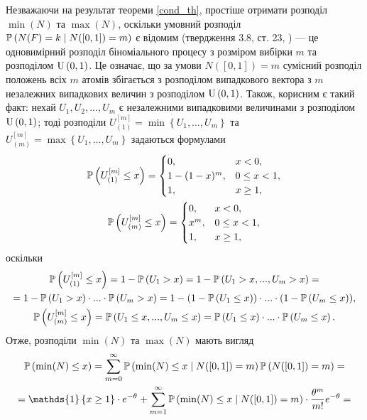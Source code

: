 Незважаючи на результат теореми \ref{cond_th}, простіше отримати розподіл
 $\min(N)$ та $\max(N)$, %
оскільки умовний розподіл $\P{N(F) = k \mid N([0, 1]) = m}$ 
є відомим (твердження 3.8, ст. 23, \cite{last_penrose_2017}) --- це
одновимірний розподіл
біноміального процесу з розміром вибірки $m$ та розподілом $\Unif{0, 1}$.
Це означає, що за умови $N([0, 1]) = m$
сумісний розподіл положень всіх $m$ атомів збігається з 
розподілом випадкового вектора 
з $m$ незалежних 
випадкових величин з розподілом $\Unif{0, 1}$.
Також, корисним є такий факт: нехай $U_1, U_2, \dots, U_m$ є
незалежними випадковими величинами з розподілом $\Unif{0, 1}$;
тоді розподіли $U_{(1)}^{[m]} = \min\left\{U_1, \dots, U_m\right\}$ 
та $U_{(m)}^{[m]} = \max\left\{U_1, \dots, U_m\right\}$ задаються
формулами
\begin{gather*}
    \P{U_{(1)}^{[m]} \leq x} = \begin{cases}
        0, & x < 0, \\
        1 - (1 - x)^m, & 0 \leq x < 1, \\
        1, & x \geq 1,
    \end{cases} \\
    \P{U_{(m)}^{[m]} \leq x} = \begin{cases}
        0, & x < 0, \\
        x^m, & 0 \leq x < 1, \\
        1, & x \geq 1,
    \end{cases}
\end{gather*}
оскільки
\begin{gather*}
    \P{U_{(1)}^{[m]} \leq x} = 1 - \P{U_{{1}} > x} = 1 - \P{U_1 > x, ..., U_m > x} = 
    \\ = 1 - \P{U_1 > x} \cdot ... \cdot \P{U_m > x} = 
    1 - (1 - \P{U_1 \leq x}) \cdot ... \cdot (1 - \P{U_m \leq x}), \\
    \P{U_{(m)}^{[m]} \leq x} = \P{U_1 \leq x, ..., U_m \leq x} = 
    \P{U_1 \leq x} \cdot ... \cdot \P{U_m \leq x}.
\end{gather*}
Отже, розподіли $\min(N)$ та $\max(N)$ мають вигляд
\begin{gather*}
    \P{\min(N) \leq x} = \sum_{m=0}^{\infty} \P{\min(N) \leq x \mid N([0, 1]) = m} \P{N([0, 1]) = m} = \\
     = \mathds{1}\left\{x\geq 1\right\}\cdot e^{-\theta} +
    \sum_{m=1}^{\infty} \P{\min(N) \leq x \mid N([0, 1]) = m} \cdot \frac{\theta^m}{m!} e^{-\theta} = \\
\end{gather*}
